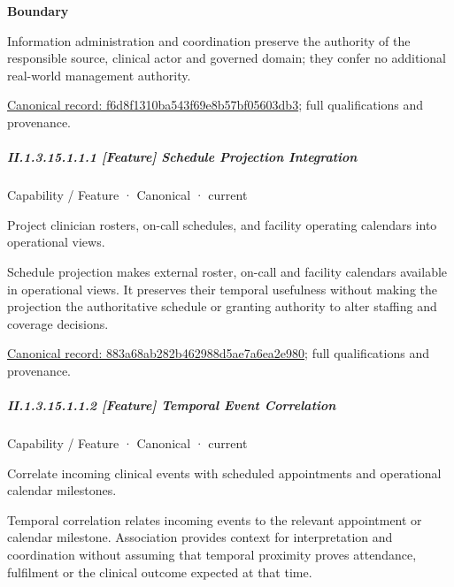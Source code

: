 \textbf{Boundary}



Information administration and coordination preserve the authority of the responsible source, clinical actor and governed domain; they confer no additional real-world management authority.


{\footnotesize \href{../../../../continuum/strategy/capability/f6d8f1310ba543f69e8b57bf05603db3.md}{Canonical record: f6d8f1310ba543f69e8b57bf05603db3}; full qualifications and provenance.}\par
\subparagraph*{II.1.3.15.1.1.1 [Feature] Schedule Projection Integration}
\label{navigation:II.1.3.15.1.1.1}

\label{element:883a68ab282b462988d5ae7a6ea2e980}
{\small Capability / Feature · Canonical · current}\par

Project clinician rosters, on-call schedules, and facility operating calendars into operational views.



Schedule projection makes external roster, on-call and facility calendars available in operational views. It preserves their temporal usefulness without making the projection the authoritative schedule or granting authority to alter staffing and coverage decisions.


{\footnotesize \href{../../../../continuum/strategy/capability/feature/883a68ab282b462988d5ae7a6ea2e980.md}{Canonical record: 883a68ab282b462988d5ae7a6ea2e980}; full qualifications and provenance.}\par
\subparagraph*{II.1.3.15.1.1.2 [Feature] Temporal Event Correlation}
\label{navigation:II.1.3.15.1.1.2}

\label{element:05e1c23baf1c47fbac8457f991efa2be}
{\small Capability / Feature · Canonical · current}\par

Correlate incoming clinical events with scheduled appointments and operational calendar milestones.



Temporal correlation relates incoming events to the relevant appointment or calendar milestone. Association provides context for interpretation and coordination without assuming that temporal proximity proves attendance, fulfilment or the clinical outcome expected at that time.


